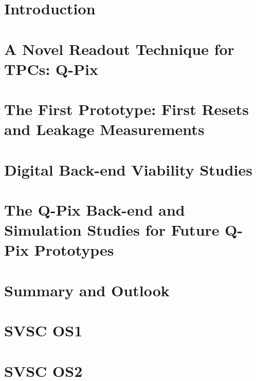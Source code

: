 \documentclass[12pt]{uh_thesis}
\begin{document}
\chapter{Introduction}
\label{chap:intro}


\chapter{A Novel Readout Technique for TPCs: Q-Pix}
\label{chap:qpix}


\chapter{The First Prototype: First Resets and Leakage Measurements}
\label{chap:saq}


\chapter{Digital Back-end Viability Studies}
\label{chap:qdb}


\chapter{The Q-Pix Back-end and Simulation Studies for Future Q-Pix Prototypes}
\label{chap:sim}


\chapter{Summary and Outlook}
\label{chap:summary}


\printbibliography[heading=bibintoc]

\appendix
\chapter{SVSC OS1}
\label{chap:OS1}



\chapter{SVSC OS2}
\label{chap:OS2}



\printindex
\end{document}
